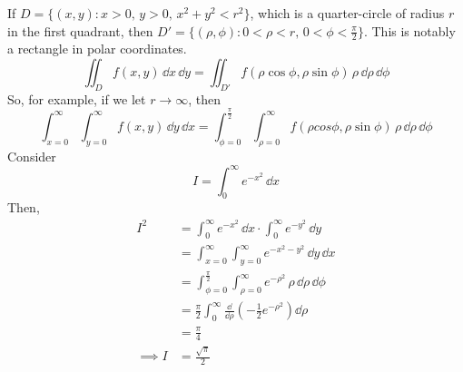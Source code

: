 \documentclass{article}
\begin{document}
If $D = \{ (x, y) \colon x > 0,\, y > 0,\, x^2 + y^2 < r^2 \}$, which is a quarter-circle of radius $r$ in the first quadrant, then $D' = \{ (\rho, \phi) \colon 0 < \rho < r,\, 0 < \phi < \frac{\pi}{2} \}$. This is notably a rectangle in polar coordinates.
\[ \iint_D f(x, y)\,\dd x \,\dd y = \iint_{D'} f(\rho \cos \phi, \rho \sin \phi) \,\rho \,\dd \rho \,\dd \phi \]
So, for example, if we let $r \to \infty$, then
\[ \int_{x=0}^\infty \int_{y=0}^\infty f(x, y) \,\dd y\,\dd x = \int_{\phi = 0}^{\frac{\pi}{2}} \int_{\rho = 0}^\infty f(\rho cos \phi, \rho \sin \phi) \,\rho\,\dd \rho\,\dd \phi \]
Consider
\[ I = \int_0^\infty e^{-x^2} \,\dd x \]
Then,
\begin{align*}
    I^2        & = \int_0^\infty e^{-x^2} \,\dd x \cdot \int_0^\infty e^{-y^2} \,\dd y                              \\
               & = \int_{x=0}^\infty \int_{y=0}^\infty e^{-x^2-y^2} \,\dd y\,\dd x                                  \\
               & = \int_{\phi = 0}^{\frac{\pi}{2}} \int_{\rho = 0}^\infty e^{-\rho^2} \,\rho\,\dd \rho\,\dd \phi    \\
               & = \frac{\pi}{2} \int_0^\infty \frac{\dd}{\dd \rho} \left( -\frac{1}{2}e^{-\rho^2} \right) \dd \rho \\
               & = \frac{\pi}{4}                                                                                    \\
    \implies I & = \frac{\sqrt{\pi}}{2}
\end{align*}
\end{document}
